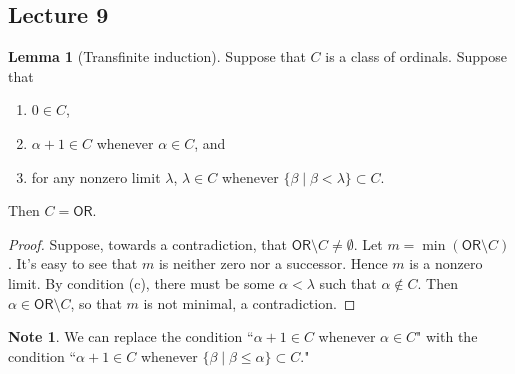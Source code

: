\documentclass[10pt,letterpaper,cm]{nupset}
\theoremstyle{definition}
\newtheorem{note}[definition]{Note}
\theoremstyle{theorem}
\newtheorem{lemma}[definition]{Lemma}
\theoremstyle{remark}
\newcommand{\1}{\mathbf{1}}
\newcommand{\0}{\vec 0}
\newcommand{\ord}{\mathsf{OR}}
\begin{document}
\subsection{Lecture 9}

\begin{lemma}[Transfinite induction]
Suppose that $C$ is a class of ordinals. Suppose that
\begin{enumerate}[label = (\alph*)]
\item $0\in C$,
\item $\alpha +1 \in C$ whenever $\alpha \in C$, and
\item for any nonzero limit $\lambda$, $\lambda \in C$ whenever $\{\beta \mid \beta < \lambda \} \subset C$. 
\end{enumerate}
Then $C = \ord$. 
\end{lemma}
\begin{proof}
Suppose, towards a contradiction, that $\ord \setminus C \ne \emptyset$. Let $m = \min(\ord \setminus C)$. It's easy to see that $ m$ is neither zero nor a successor. Hence $m$ is a nonzero limit. By condition (c), there must be some $\alpha < \lambda$ such that $\alpha \notin C$. Then $\alpha \in \ord \setminus C$, so that $m$ is not minimal, a contradiction. 
\end{proof}

\begin{note}
We can replace the condition ``$\alpha +1 \in C$ whenever $\alpha \in C$" with the condition ``$\alpha +1 \in C$ whenever $\{\beta \mid \beta \leq \alpha \} \subset C$."
\end{note}
\end{document}
